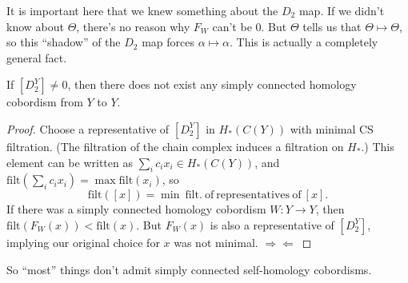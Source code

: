 \documentclass[main]{subfiles}
\begin{document}
It is important here that we knew something about the $D_2$ map. If we didn't know about $\Theta$, there's no reason why $F_W$ can't be $0$. But $\Theta$ tells us that $\Theta\mapsto\Theta$, so this ``shadow'' of the $D_2$ map forces $\alpha\mapsto\alpha$. This is actually a completely general fact.

\begin{theorem}
If $[D_2^Y]\neq 0$, then there does not exist any simply connected homology cobordism from $Y$ to $Y$.
\end{theorem}

\begin{proof}
Choose a representative of $[D_2^Y]$ in $H_\ast(C(Y))$ with minimal CS filtration. (The filtration of the chain complex induces a filtration on $H_\ast$.) This element can be written as $\sum_i c_ix_i\in H_\ast(C(Y))$, and $\mathrm{filt}\left(\sum_i c_ix_i\right)=\max\mathrm{filt}(x_i)$, so
\[
\mathrm{filt}([x]) = \min\ \mathrm{filt.\ of\ representatives\ of\ }[x].
\]
If there was a simply connected homology cobordism $W:Y\to Y$, then $\mathrm{filt}(F_W(x))<\mathrm{filt}(x)$. But $F_W(x)$ is also a representative of $[D_2^Y]$, implying our original choice for $x$ was not minimal. $\Rightarrow\Leftarrow$ \qedhere
\end{proof}

So ``most'' things don't admit simply connected self-homology cobordisms.
\end{document}
